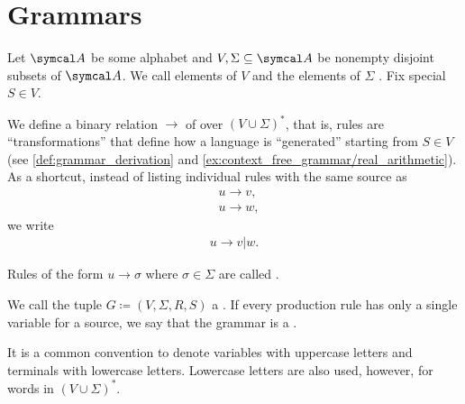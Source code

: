 \section{Grammars}\label{sec:grammars}

\begin{definition}\label{def:grammar}\cite[definition 2.2]{Sipser2013}
  Let $\Cal{A}$ be some alphabet and $V, \Sigma \subseteq \Cal{A}$ be nonempty disjoint subsets of $\Cal{A}$. We call elements of $V$  and the elements of $\Sigma$ . Fix special  $S \in V$.

  We define a binary relation $\to$ of  over $(V \cup \Sigma)^*$, that is, rules are \enquote{transformations} that define how a language is \enquote{generated} starting from $S \in V$ (see \cref{def:grammar_derivation} and \cref{ex:context_free_grammar/real_arithmetic}). As a shortcut, instead of listing individual rules with the same source as
  \begin{align*}
    &u \to v, \\
    &u \to w,
  \end{align*}
  we write
  \begin{align*}
    u \to v | w.
  \end{align*}

  Rules of the form $u \to \sigma$ where $\sigma \in \Sigma$ are called .

  We call the tuple $G \coloneqq (V, \Sigma, R, S)$ a . If every production rule has only a single variable for a source, we say that the grammar is a .
\end{definition}

\begin{note}\label{note:grammar_symbol_case}
  It is a common convention to denote variables with uppercase letters and terminals with lowercase letters. Lowercase letters are also used, however, for words in $(V \cup \Sigma)^*$.
\end{note}


